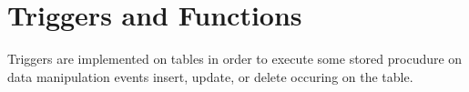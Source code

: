 \section{Triggers and Functions}\label{sec_triggers_and_functions}

Triggers are implemented on tables in order to execute some stored procudure on data manipulation events insert, update, or delete occuring on the table.

		
		
    
    

		
		
		


% 
% 		
% 		

